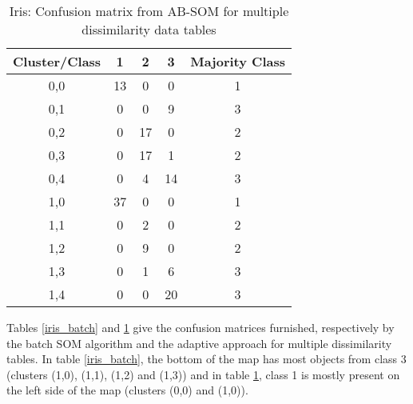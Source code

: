 \documentclass[10pt, conference, compsocconf]{IEEEtran}
\begin{document}
\begin{table}[!h]
\renewcommand{\arraystretch}{1.2}
\begin{center}
\caption{Iris: Confusion matrix from AB-SOM for multiple dissimilarity data tables}
\begin{tabular}{|c|c|c|c||c|}
\hline
Cluster/Class & 1 & 2 & 3 & Majority Class\\ \hline
0,0 & 13 & 0 & 0 & 1\\ \hline
0,1 & 0 & 0 & 9 & 3\\ \hline
0,2 & 0 & 17 & 0 & 2\\ \hline
0,3 & 0 & 17 & 1 & 2\\ \hline
0,4 & 0 & 4 & 14 & 3\\ \hline \hline
1,0 & 37 & 0 & 0 & 1\\ \hline
1,1 & 0 & 2 & 0 & 2\\ \hline
1,2 & 0 & 9 & 0 & 2\\ \hline
1,3 & 0 & 1 & 6 & 3\\ \hline
1,4 & 0 & 0 & 20 & 3\\ \hline

\end{tabular}
\label{iris_adaptativo}
\end{center}
\end{table}

Tables \ref{iris_batch} and \ref{iris_adaptativo} give the confusion matrices furnished, respectively by the batch SOM algorithm and the adaptive approach for multiple dissimilarity tables. In table \ref{iris_batch}, the bottom of the map has most objects from class 3 (clusters (1,0), (1,1), (1,2) and (1,3)) and in table \ref{iris_adaptativo}, class 1 is mostly present on the left side of the map (clusters (0,0) and (1,0)).
\end{document}
